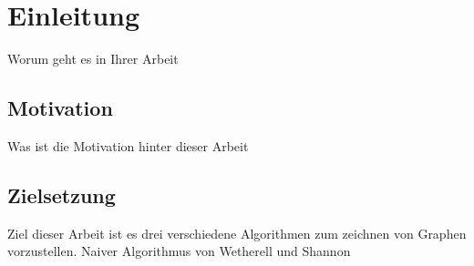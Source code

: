 \chapter{Einleitung}
\label{chap:einleitung}
Worum geht es in Ihrer Arbeit

\section{Motivation}
\label{sec:motivation}
Was ist die Motivation hinter dieser Arbeit

\section{Zielsetzung}
\label{sec:zielsetzung}
Ziel dieser Arbeit ist es drei verschiedene Algorithmen zum zeichnen von
Graphen vorzustellen. Naiver Algorithmus von Wetherell und Shannon
